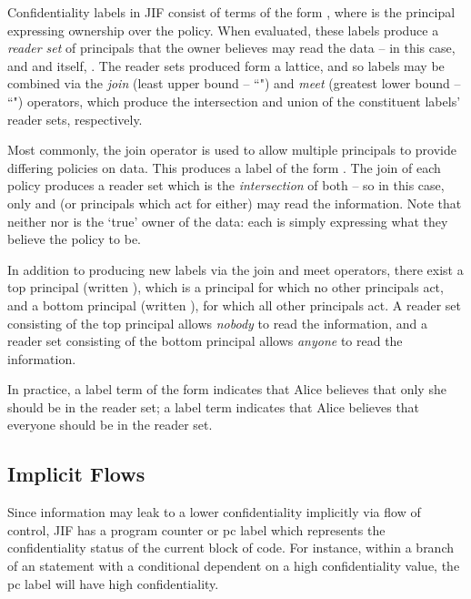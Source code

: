 Confidentiality labels in JIF consist of terms of the form , where  is the principal expressing ownership over the policy. When evaluated, these labels produce a \textit{reader set} of principals that the owner believes may read the data -- in this case,  and  and itself, . The reader sets produced form a lattice, and so labels may be combined via the \textit{join} (least upper bound -- ``\mono{;}") and \textit{meet} (greatest lower bound -- ``") operators, which produce the intersection and union of the constituent labels' reader sets, respectively.

Most commonly, the join operator is used to allow multiple principals to provide differing policies on data. This produces a label of the form . The join of each policy produces a reader set which is the \textit{intersection} of both -- so in this case, only  and  (or principals which act for either) may read the information. Note that neither  nor  is the `true' owner of the data: each is simply expressing what they believe the policy to be.

In addition to producing new labels via the join and meet operators, there exist a top principal (written \mono{*}), which is a principal for which no other principals act, and a bottom principal (written \mono{\_}), for which all other principals act. A reader set consisting of the top principal allows \textit{nobody} to read the information, and a reader set consisting of the bottom principal allows \textit{anyone} to read the information.

In practice, a label term of the form  indicates that Alice believes that only she should be in the reader set; a label term  indicates that Alice believes that everyone should be in the reader set.

\subsection{Implicit Flows}

Since information may leak to a lower confidentiality implicitly via flow of control, JIF has a program counter or pc label which represents the confidentiality status of the current block of code. For instance, within a branch of an  statement with a conditional dependent on a high confidentiality value, the pc label will have high confidentiality.

